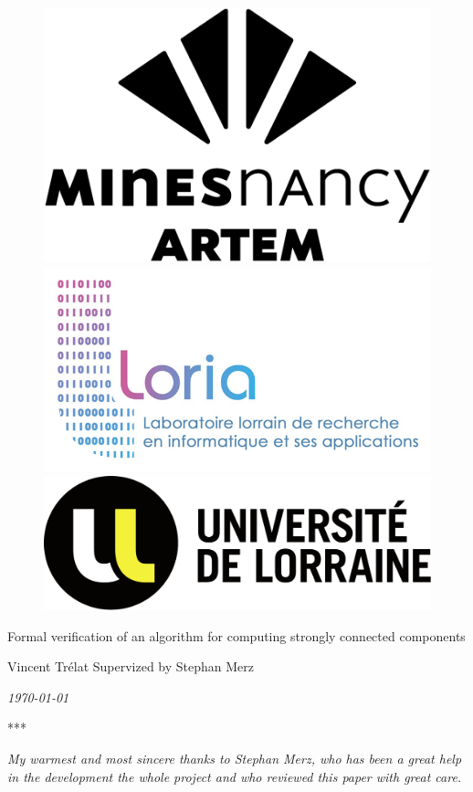 \documentclass[a4 paper, 12pt]{article}
\theoremstyle{definition}
\newcommand\blankpage{%
    \null
    \thispagestyle{empty}%
    \addtocounter{page}{-1}%
    \newpage}
\begin{document}
\begin{titlepage}
    \begin{figure}[!h]
        \centering
        \includegraphics[height = .1\textwidth]{img/logoartem.png}
        \hspace{1cm}
        \includegraphics[height = .1\textwidth]{img/logoloria.jpg}
        \hspace{1cm}
        \includegraphics[height = .1\textwidth]{img/logoUL.png}
    \end{figure}
    \vspace{3cm}

    \begin{center}
        \huge{Formal verification of an algorithm for computing strongly connected components}
    \end{center}
    \vspace{3 cm}
    \begin{center}
        Vincent Trélat
        \BlankLine
        \BlankLine
        Supervized by Stephan Merz
    \end{center}
    \vspace{3 cm}
    \begin{center}
        \textit{\today}
    \end{center}
    \vspace{3 cm}
    \begin{center}
        ***
    \end{center}
    
\end{titlepage}
\restoregeometry

\blankpage

\hfill
\begin{minipage}{.45\textwidth}
    \textit{
    My warmest and most sincere thanks to Stephan Merz, who has been a great help in the development the whole project and who reviewed this paper with great care.
    }
\end{minipage}
\end{document}
